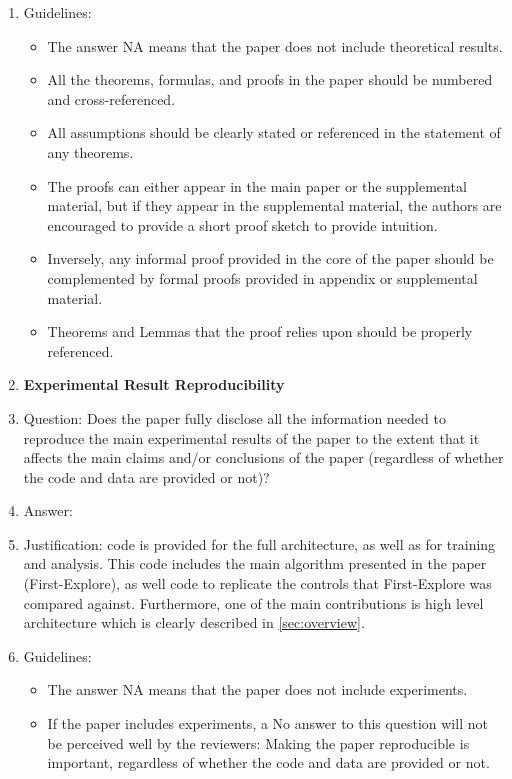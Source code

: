 \documentclass{article}
\begin{document}
\begin{enumerate}
    \item[] Guidelines:
    \begin{itemize}
        \item The answer NA means that the paper does not include theoretical results.
        \item All the theorems, formulas, and proofs in the paper should be numbered and cross-referenced.
        \item All assumptions should be clearly stated or referenced in the statement of any theorems.
        \item The proofs can either appear in the main paper or the supplemental material, but if they appear in the supplemental material, the authors are encouraged to provide a short proof sketch to provide intuition.
        \item Inversely, any informal proof provided in the core of the paper should be complemented by formal proofs provided in appendix or supplemental material.
        \item Theorems and Lemmas that the proof relies upon should be properly referenced.
    \end{itemize}
    \item {\bf Experimental Result Reproducibility}
    \item[] Question: Does the paper fully disclose all the information needed to reproduce the main experimental results of the paper to the extent that it affects the main claims and/or conclusions of the paper (regardless of whether the code and data are provided or not)?
    \item[] Answer: \answerYes{}
    \item[] Justification: code is provided for the full architecture, as well as for training and analysis. This code includes the main algorithm presented in the paper (First-Explore), as well code to replicate the controls that First-Explore was compared against. Furthermore, one of the main contributions is high level architecture which is clearly described in \cref{sec:overview}.
    \item[] Guidelines:
    \begin{itemize}
        \item The answer NA means that the paper does not include experiments.
        \item If the paper includes experiments, a No answer to this question will not be perceived well by the reviewers: Making the paper reproducible is important, regardless of whether the code and data are provided or not.

\end{itemize}
\end{enumerate}
\end{document}
